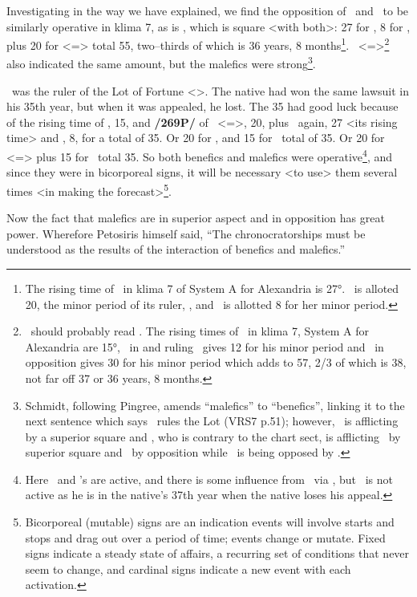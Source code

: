 Investigating in the way we have explained, we find the opposition of \Mars\, and \Venus\, to be similarly operative in klima
7, as is \Saturn, which is square <with both>: 27 for \Gemini, 8 for \Venus, plus 20 for \Virgo <=\Mercury> total 55, two--thirds of which is 36 years, 8 months\footnote{The rising time of \Gemini\, in klima 7 of System A for Alexandria is 27°. \Virgo\, is alloted 20, the minor period of its ruler, \Mercury, and \Venus\, is allotted 8 for her minor period.}. \Pisces\, <=\Saturn>\footnote{\Saturn\, should probably read \Jupiter. The rising times of \Pisces\, in klima 7, System A for Alexandria are 15°, \Jupiter\, in and ruling \Pisces\, gives 12 for his minor period and \Saturn\, in opposition gives 30 for his minor period which adds to 57, 2/3 of which is 38, not far off 37 or 36 years, 8 months.} also indicated the same amount, but the malefics were strong\footnote{Schmidt, following Pingree, amends ``malefics'' to ``benefics'', linking it to the next sentence which says \Venus\, rules the Lot (VRS7 p.51); however, \Saturn\, is afflicting \Mars\, by a superior square and \Mars, who is contrary to the chart sect, is afflicting \Jupiter\, by superior square and \Venus\, by opposition while \Jupiter\, is being opposed by \Saturn.}. 

\Venus\, was the ruler of the Lot of Fortune <\Libra>. The native had won the same lawsuit in his 35th year, but when it was appealed, he lost. The 35 had good luck because of the rising time of \Pisces, 15, and \textbf{/269P/} of \Gemini\, <=\Mercury>, 20, plus \Gemini\, again, 27 <its rising time> and \Venus, 8, for a total of 35. Or 20 for \Gemini, and 15 for \Mars\, total of 35. Or 20 for \Virgo\, <=\Mercury> plus 15 for \Mars\, total 35. So both benefics and malefics were operative\footnote{Here \Venus\, and \Mars's are active, and there is some influence from \Jupiter\, via \Pisces, but \Saturn\, is not active as he is in the native's 37th year when the native loses his appeal.}, and since they were in bicorporeal signs, it will be necessary <to use> them several times <in making the forecast>\footnote{Bicorporeal (mutable) signs are an indication events will involve starts and stops and drag out over a period of time; events change or mutate. Fixed signs indicate a steady state of affairs, a recurring set of conditions that never seem to change, and cardinal signs indicate a new event with each activation.}. 

Now \mndl the fact that malefics are in superior aspect and in opposition has great power. Wherefore Petosiris himself said, “The chronocratorships must be understood as the results of the interaction of benefics and malefics.” 

